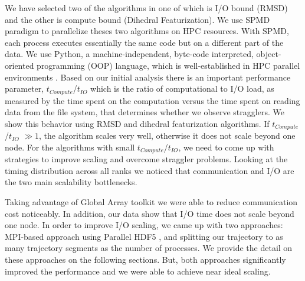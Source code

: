 We have selected two of the algorithms in  one of which is I/O bound (RMSD) and the other is compute bound (Dihedral Featurization).
We use SPMD paradigm to parallelize theses two algorithms on HPC resources.
With SPMD, each process executes essentially the same code but on a different part of the data. 
We use Python, a machine-independent, byte-code interpreted, object-oriented programming (OOP) language, which is well-established in HPC parallel environments \cite{GAiN}. 
Based on our initial analysis there is an important performance parameter,  $t_{Compute}$/$t_{IO}$ which is the ratio of computational to I/O load, as measured by the time spent on the computation versus the time spent on reading data from the file system, that determines whether we observe stragglers.
We show this behavior using RMSD and dihedral featurization algorithms.
If $t_{Compute}$/$t_{IO}$  $\gg 1$, the algorithm scales very well, otherwise it does not scale beyond one node. 
For the algorithms with small $t_{Compute}$/$t_{IO}$, we need to come up with strategies to improve scaling and overcome straggler problems.
Looking at the timing distribution across all ranks we noticed that communication and I/O are the two main scalability bottlenecks.

Taking advantage of Global Array toolkit we were able to reduce communication cost noticeably.
In addition, our data show that I/O time does not scale beyond one node. 
In order to improve I/O scaling, we came up with two approaches: MPI-based approach using Parallel HDF5 \cite{pythonhdf5}, and splitting our trajectory to as many trajectory segments as the number of processes. 
We provide the detail on these approaches on the following sections.
But, both approaches significantly improved the performance and we were able to achieve near ideal scaling.